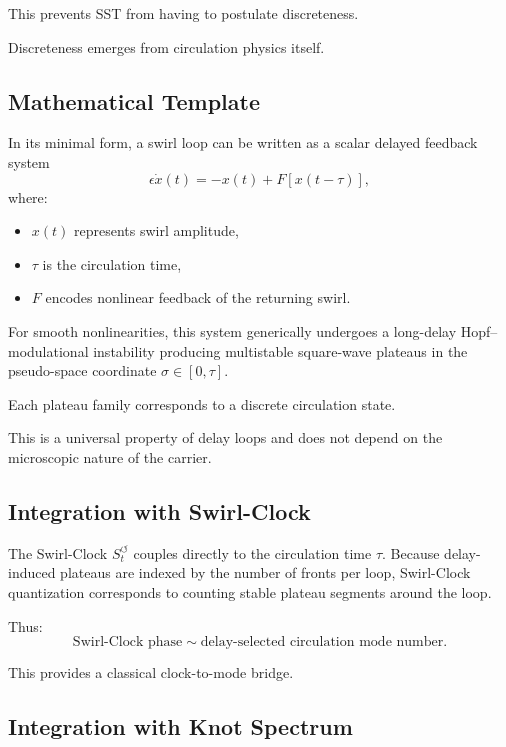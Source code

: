 \documentclass[10pt]{article}
\begin{document}
This prevents SST from having to postulate discreteness.

Discreteness emerges from circulation physics itself.

\subsection{Mathematical Template}

In its minimal form, a swirl loop can be written as a scalar delayed feedback system
\begin{equation}
    \epsilon \dot{x}(t) = -x(t) + F[x(t-\tau)],
    \label{eq:delay_feedback}
\end{equation}
where:
\begin{itemize}
    \item $x(t)$ represents swirl amplitude,
    \item $\tau$ is the circulation time,
    \item $F$ encodes nonlinear feedback of the returning swirl.
\end{itemize}

For smooth nonlinearities, this system generically undergoes a long-delay Hopf--modulational instability producing multistable square-wave plateaus in the pseudo-space coordinate $\sigma \in [0,\tau]$.

Each plateau family corresponds to a discrete circulation state.

This is a universal property of delay loops and does not depend on the microscopic nature of the carrier.

\subsection{Integration with Swirl-Clock}

The Swirl-Clock $S_t^{\circlearrowleft}$ couples directly to the circulation time $\tau$.
Because delay-induced plateaus are indexed by the number of fronts per loop, Swirl-Clock quantization corresponds to counting stable plateau segments around the loop.

Thus:
\begin{equation}
    \text{Swirl-Clock phase} \sim \text{delay-selected circulation mode number}.
\end{equation}

This provides a classical clock-to-mode bridge.

\subsection{Integration with Knot Spectrum}
\end{document}
